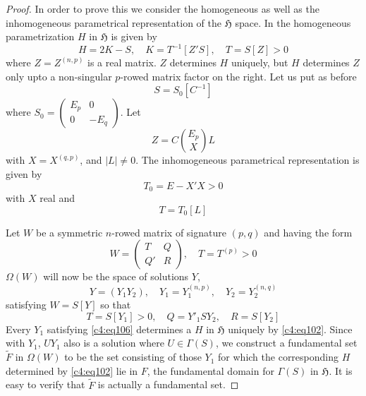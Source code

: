 \begin{proof}
In order to prove this we consider the homogeneous as well as the
inhomogeneous parametrical representation of the $\mathfrak{H}$
space. In the homogeneous parametrization $H$ in $\mathfrak{H}$ is
given by 
\begin{equation*}
H=2K-S,\quad K=T^{-1}[Z'S],\quad T=S[Z]>0\tag{102}\label{c4:eq102}
\end{equation*}
where $Z=Z^{(n,p)}$ is a real matrix. $Z$ determines $H$ uniquely, but
$H$ determines $Z$ only upto a non-singular $p$-rowed matrix factor on
the right. Let us put as before
$$
S=S_{0}[C^{-1}]
$$
where $S_{0} = \left(\begin{smallmatrix} E_{p} & 0\\ 0 & -E_{q}
\end{smallmatrix}\right)$. Let
$$
Z=C\binom{E_p}{X}L
$$
with $X=X^{(q,p)}$, and $|L|\neq 0$. The inhomogeneous parametrical
representation is given by
\begin{equation*}
T_{0}=E-X'X>0\tag{103}\label{c4:eq103}
\end{equation*}
with $X$ real and
\begin{equation}
T=T_{0}[L]\tag{104}\label{c4:eq104}
\end{equation}

Let $W$ be a symmetric $n$-rowed matrix of signature $(p,q)$ and
having the form
\begin{equation*}
W=\begin{pmatrix}
T & Q\\
Q' & R
\end{pmatrix},\quad
T=T^{(p)}>0\tag{105}\label{c4:eq105}
\end{equation*}
$\Omega (W)$ will now be the space of solutions $Y$,
$$
Y=(Y_{1}Y_{2}),\quad Y_{1}=Y_{1}^{(n,p)},\quad Y_{2}=Y_{2}^{(n,q)}
$$
satisfying $W=S[Y]$ so that
\begin{equation*}
T=S[Y_{1}]>0,\quad Q=Y'_{1}SY_{2},\quad R=S[Y_{2}]\tag{106}\label{c4:eq106}
\end{equation*}\pageoriginale 
Every $Y_{1}$ satisfying \eqref{c4:eq106} determines a $H$ in
$\mathfrak{H}$ uniquely by \eqref{c4:eq102}. Since with $Y_{1}$, $UY_{1}$
also is a solution where $U\in\Gamma(S)$, we construct a fundamental
set $\widetilde{F}$ in $\Omega(W)$ to be the set consisting of those
$Y_{1}$ for which the corresponding $H$ determined by \eqref{c4:eq102} lie
in $F$, the fundamental domain for $\Gamma(S)$ in $\mathfrak{H}$. It
is easy to verify that $\widetilde{F}$ is actually a fundamental set.
\end{proof}

